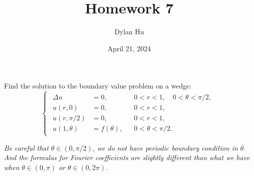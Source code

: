 \documentclass[plain]{pset}
\title{Homework 7}
\author{Dylan Hu}
\date{April 21, 2024}
\begin{document}
\maketitle

\pagebreak

\begin{problem}
Find the solution to the boundary value problem on a wedge:
\[
    \begin{cases}
        \begin{aligned}
            \Delta u     & = 0,         &  & 0 < r < 1, \quad 0 < \theta < \pi/2, \\
            u(r, 0)      & = 0,         &  & 0 < r < 1,                           \\
            u(r, \pi/2)  & = 0,         &  & 0 < r < 1,                           \\
            u(1, \theta) & = f(\theta), &  & 0 < \theta < \pi/2.
        \end{aligned}
    \end{cases}
\]
\begin{hint}
    \emph{Be careful that \(\theta \in (0, \pi/2)\), we do not have periodic boundary condition in \(\theta\). And the formulas for Fourier coefficients are slightly different than what we have when \(\theta \in (0, \pi)\) or \(\theta \in (0, 2\pi)\).}
\end{hint}
\end{problem}
\end{document}
